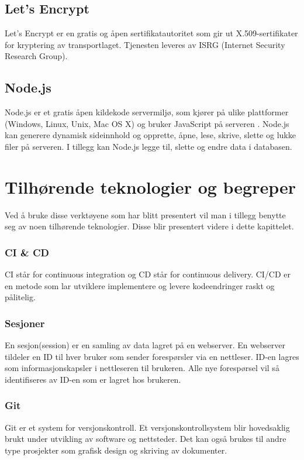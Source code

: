 \subsection{Let’s Encrypt}
Let’s Encrypt \cite{le2019ale} er en gratis og åpen sertifikatautoritet som gir ut X.509-sertifikater for kryptering av transportlaget. Tjenesten leveres av ISRG (Internet Security Research Group).


\subsection{Node.js}
Node.js er et gratis åpen kildekode servermiljø, som kjører på ulike plattformer (Windows, Linux, Unix, Mac OS X) og bruker JavaScript på serveren \cite{w3schools2019win}. Node.js kan generere dynamisk sideinnhold og opprette, åpne, lese, skrive, slette og lukke filer på serveren. I tillegg kan Node.js legge til, slette og endre data i databasen.


\section{Tilhørende teknologier og begreper}
Ved å bruke disse verktøyene som har blitt presentert vil man i tillegg benytte seg av noen tilhørende teknologier. Disse blir presentert videre i dette kapittelet.

\subsubsection{CI \& CD}
CI står for continuous integration og CD står for continuous delivery. CI/CD\cite{Pittet2019cd} er en metode som lar utviklere implementere og levere kodeendringer raskt og pålitelig.

\subsubsection{Sesjoner}
En sesjon\cite{progress2017ohs}(session) er en samling av data lagret på en webserver. En webserver tildeler en ID til hver bruker som sender forespørsler via en nettleser. ID-en lagres som informasjonskapsler i nettleseren til brukeren. Alle nye forespørsel vil så identifiseres av ID-en som er lagret hos brukeren.

\subsubsection{Git}
Git\cite{TechTarget} er et system for versjonskontroll. Et versjonskontrollsystem blir hovedsaklig brukt under utvikling av software og nettsteder. Det kan også brukes til andre type prosjekter som grafisk design og skriving av dokumenter.

